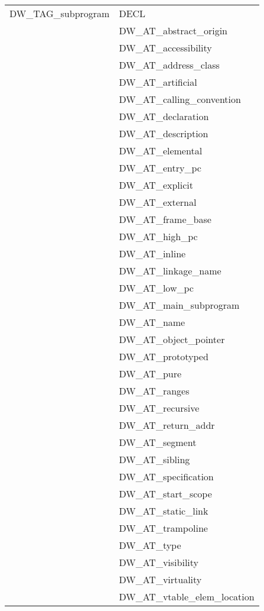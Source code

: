 \begin{longtable}{l|p{8cm}}
DW\_TAG\_subprogram
&DECL  \\
&DW\_AT\_abstract\_origin  \\
&DW\_AT\_accessibility  \\
&DW\_AT\_address\_class  \\
&DW\_AT\_artificial  \\
&DW\_AT\_calling\_convention  \\
&DW\_AT\_declaration  \\
&DW\_AT\_description  \\
&DW\_AT\_elemental  \\
&DW\_AT\_entry\_pc  \\
&DW\_AT\_explicit  \\
&DW\_AT\_external  \\
&DW\_AT\_frame\_base  \\
&DW\_AT\_high\_pc  \\
&DW\_AT\_inline  \\
&DW\_AT\_linkage\_name  \\
&DW\_AT\_low\_pc  \\
&DW\_AT\_main\_subprogram  \\
&DW\_AT\_name  \\
&DW\_AT\_object\_pointer  \\
&DW\_AT\_prototyped  \\
&DW\_AT\_pure  \\
&DW\_AT\_ranges  \\
&DW\_AT\_recursive  \\
&DW\_AT\_return\_addr  \\
&DW\_AT\_segment  \\
&DW\_AT\_sibling  \\
&DW\_AT\_specification  \\
&DW\_AT\_start\_scope  \\
&DW\_AT\_static\_link  \\
&DW\_AT\_trampoline  \\
&DW\_AT\_type  \\
&DW\_AT\_visibility  \\
&DW\_AT\_virtuality  \\
&DW\_AT\_vtable\_elem\_location  \\


\end{longtable}
